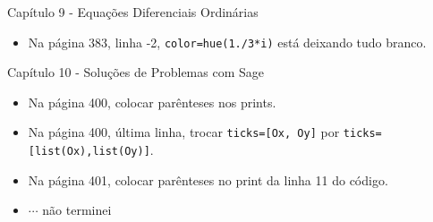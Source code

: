 \documentclass[10pt,a4paper]{report}
\begin{document}
\vspace{1cm}
\noindent
{\large Capítulo 9 - Equações Diferenciais Ordinárias}


\begin{itemize}



\item Na página 383, linha -2, \verb|color=hue(1./3*i)| está deixando tudo branco.

\end{itemize}


\vspace{1cm}
\noindent
{\large Capítulo 10 - Soluções de Problemas com Sage}


\begin{itemize}
 \item Na página 400, colocar parênteses nos prints. 
 \item Na página 400, última linha, trocar \verb|ticks=[Ox, Oy]| por \verb|ticks=[list(Ox),list(Oy)]|.
 \item Na página 401, colocar parênteses no print da linha 11 do código. 
 \item $\cdots$ não terminei 
\end{itemize}



% 
% 


% 
% 
% 
% 
% 
\end{document}
